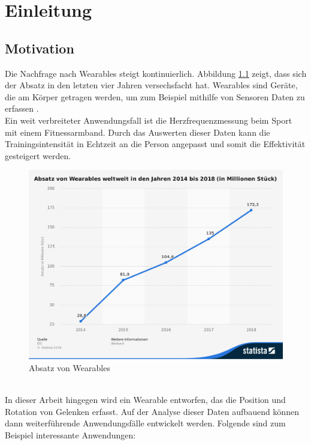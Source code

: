 \chapter{Einleitung}

\section{Motivation}
Die Nachfrage nach Wearables steigt kontinuierlich.
Abbildung \ref{fig:stat_wearables} zeigt, dass sich der Absatz in den letzten vier Jahren versechsfacht hat.
Wearables sind Geräte, die am Körper getragen werden, um zum Beispiel mithilfe von Sensoren Daten zu erfassen \cite{definition_wearables}.\\
Ein weit verbreiteter Anwendungsfall ist die Herzfrequenzmessung beim Sport mit einem Fitnessarmband.
Durch das Auswerten dieser Daten kann die Trainingsintensität in Echtzeit an die Person angepasst und somit die Effektivität gesteigert werden.
\begin{figure}[h]
	\centering
	\includegraphics[width=0.75\linewidth]{res/01_statistic_id515723_absatz-von-wearables-weltweit-bis-2018.png}
	\caption{Absatz von Wearables \cite{statistik_wearables}}
	\label{fig:stat_wearables}
\end{figure}\\
In dieser Arbeit hingegen wird ein Wearable entworfen, das die Position und Rotation von Gelenken erfasst.
Auf der Analyse dieser Daten aufbauend können dann weiterführende Anwendungsfälle entwickelt werden.
Folgende sind zum Beispiel interessante Anwendungen:
